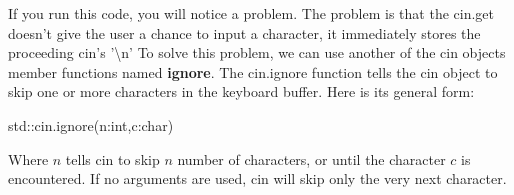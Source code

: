 \documentclass{report}
\begin{document}
    \bigbreak \noindent 
    If you run this code, you will notice a problem. The problem is that the cin.get doesn't give the user a chance to input a character, it immediately stores the proceeding cin's '\textbackslash n'
    \bigbreak \noindent 
    To solve this problem, we can use another of the cin objects member functions named \textbf{ignore}. The cin.ignore function tells the cin object to skip one or more characters in the keyboard buffer. Here is its general form:
    \smallbreak \noindent
    
    \begin{cppcode}
            std::cin.ignore(n:int,c:char)
    \end{cppcode}
    
    \bigbreak \noindent 
    Where $n$ tells cin to skip $n$ number of characters, or until the character $c$ is encountered. If no arguments are used, cin will skip only the very next character.
\end{document}
